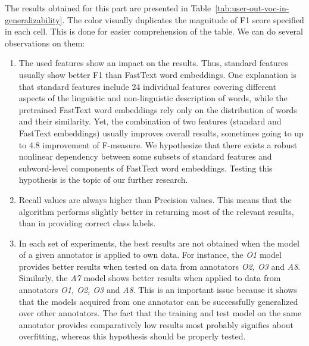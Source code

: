 The results obtained for this part are presented in Table~\ref{tab:user-out-voc-in-generalizability}. The color visually duplicates the magnitude of F1 score specified in each cell. This is done for easier comprehension of the table. We can do several observations on them:
\begin{enumerate}[listparindent=1.5em]
    \item The used features show an impact on the results. Thus, standard features usually show better F1 than FastText word embeddings. One explanation is that standard features include 24 individual features covering different aspects of the linguistic and non-linguistic description of words, while the pretrained FastText word embeddings rely only on the distribution of words and their similarity. Yet, the combination of two features (standard and FastText embeddings) usually improves overall results, sometimes going to up to 4.8 improvement of F-measure.  We hypothesize that there exists a robust nonlinear dependency between some subsets of standard features and subword-level components of FastText word embeddings. Testing this hypothesis is the topic of our further research.
    
    \item Recall values are always higher than Precision values. This means that the algorithm performs slightly better in returning most of the relevant results, than in providing correct class labels. 
    
    \item In each set of experiments, the best results are not obtained when the model of a given annotator is applied to own data. For instance, the {\it O1} model provides better results when tested on data from annotators {\it O2, O3} and {\it A8}.  Similarly, the {\it A7} model shows better results when applied to data from annotators {\it O1, O2, O3} and {\it A8}. This is an important issue because it shows that the models acquired from one annotator can be successfully generalized over other annotators. The fact that the training and test model on the same annotator provides comparatively low results most probably signifies about overfitting, whereas this hypothesis should be properly tested.
    

\end{enumerate}
